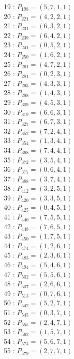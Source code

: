 \documentclass{article}
\begin{document}
{\begin{multicols}{2}
19 : $P_{198}=( 5, 7, 1, 1 )$\\
20 : $P_{221}=( 4, 2, 2, 1 )$\\
21 : $P_{231}=( 6, 3, 2, 1 )$\\
22 : $P_{239}=( 6, 4, 2, 1 )$\\
23 : $P_{241}=( 0, 5, 2, 1 )$\\
24 : $P_{250}=( 1, 6, 2, 1 )$\\
25 : $P_{261}=( 4, 7, 2, 1 )$\\
26 : $P_{281}=( 0, 2, 3, 1 )$\\
27 : $P_{293}=( 4, 3, 3, 1 )$\\
28 : $P_{298}=( 1, 4, 3, 1 )$\\
29 : $P_{309}=( 4, 5, 3, 1 )$\\
30 : $P_{319}=( 6, 6, 3, 1 )$\\
31 : $P_{327}=( 6, 7, 3, 1 )$\\
32 : $P_{352}=( 7, 2, 4, 1 )$\\
33 : $P_{354}=( 1, 3, 4, 1 )$\\
34 : $P_{368}=( 7, 4, 4, 1 )$\\
35 : $P_{372}=( 3, 5, 4, 1 )$\\
36 : $P_{377}=( 0, 6, 4, 1 )$\\
37 : $P_{388}=( 3, 7, 4, 1 )$\\
38 : $P_{412}=( 3, 2, 5, 1 )$\\
39 : $P_{420}=( 3, 3, 5, 1 )$\\
40 : $P_{425}=( 0, 4, 5, 1 )$\\
41 : $P_{440}=( 7, 5, 5, 1 )$\\
42 : $P_{448}=( 7, 6, 5, 1 )$\\
43 : $P_{450}=( 1, 7, 5, 1 )$\\
44 : $P_{474}=( 1, 2, 6, 1 )$\\
45 : $P_{483}=( 2, 3, 6, 1 )$\\
46 : $P_{494}=( 5, 4, 6, 1 )$\\
47 : $P_{502}=( 5, 5, 6, 1 )$\\
48 : $P_{507}=( 2, 6, 6, 1 )$\\
49 : $P_{513}=( 0, 7, 6, 1 )$\\
50 : $P_{542}=( 5, 2, 7, 1 )$\\
51 : $P_{545}=( 0, 3, 7, 1 )$\\
52 : $P_{555}=( 2, 4, 7, 1 )$\\
53 : $P_{562}=( 1, 5, 7, 1 )$\\
54 : $P_{574}=( 5, 6, 7, 1 )$\\
55 : $P_{579}=( 2, 7, 7, 1 )$\\
\end{multicols}
}
\end{document}
